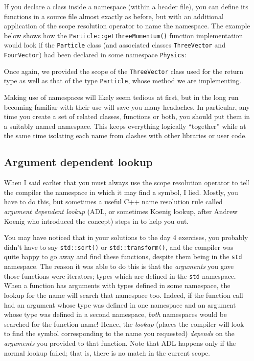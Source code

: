 \documentclass[a4paper]{scrartcl}
\begin{document}
If you declare a class inside a namespace (within a header file), you can define its functions in a source file almost exactly as before, but with an additional application of the scope resolution operator to name the namespace. The example below shows how the \texttt{Particle::getThreeMomentum()} function implementation would look if the \texttt{Particle} class (and associated classes \texttt{ThreeVector} and \texttt{FourVector}) had been declared in some namespace \texttt{Physics}:



Once again, we provided the scope of the \verb|ThreeVector| class used for the return type as well as that of the type \verb|Particle|, whose method we are implementing.

Making use of namespaces will likely seem tedious at first, but in the long run becoming familiar with their use will save you many headaches. In particular, any time you create a set of related classes, functions or both, you should put them in a suitably named namespace. This keeps everything logically ``together'' while at the same time isolating each name from clashes with other libraries or user code.

\subsection{Argument dependent lookup}
When I said earlier that you must always use the scope resolution operator to tell the compiler the namespace in which it may find a symbol, I lied. Mostly, you have to do this, but sometimes a useful C++ name resolution rule called \emph{argument dependent lookup} (ADL, or sometimes Koenig lookup, after Andrew Koenig who introduced the concept) steps in to help you out.

You may have noticed that in your solutions to the day 4 exercises, you probably didn't have to say \verb|std::sort()| or \verb|std::transform()|, and the compiler was quite happy to go away and find these functions, despite them being in the \verb|std| namespace. The reason it was able to do this is that the \emph{arguments} you gave those functions were iterators; types which are defined in the \verb|std| namespace. When a function has arguments with types defined in some namespace, the lookup for the name will search that namespace too. Indeed, if the function call had an argument whose type was defined in one namespace and an argument whose type was defined in a second namespace, \emph{both} namespaces would be searched for the function name! Hence, the \emph{lookup} (places the compiler will look to find the symbol corresponding to the name you requested) \emph{depends} on the \emph{arguments} you provided to that function. Note that ADL happens only if the normal lookup failed; that is, there is no match in the current scope.
\end{document}
